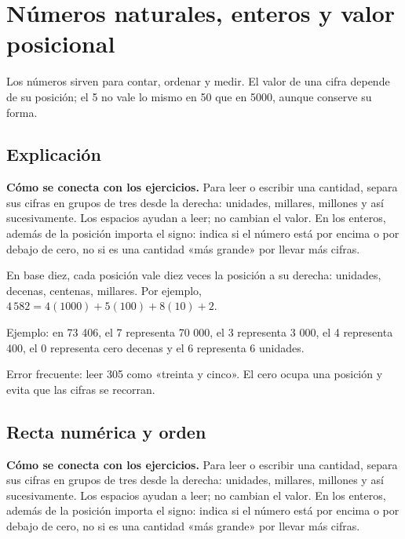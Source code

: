 \documentclass[10pt,oneside,openany]{book}
\begin{document}
\chapter{Números naturales, enteros y valor posicional}

\begin{idea}
Los números sirven para contar, ordenar y medir. El valor de una cifra depende de su posición; el 5 no vale lo mismo en 50 que en 5000, aunque conserve su forma.
\end{idea}

\section{Explicación}

\textbf{Cómo se conecta con los ejercicios.} Para leer o escribir una cantidad, separa sus cifras en grupos de tres desde la derecha: unidades, millares, millones y así sucesivamente. Los espacios ayudan a leer; no cambian el valor. En los enteros, además de la posición importa el signo: indica si el número está por encima o por debajo de cero, no si es una cantidad «más grande» por llevar más cifras.

En base diez, cada posición vale diez veces la posición a su derecha: unidades, decenas, centenas, millares. Por ejemplo, $4\,582=4(1000)+5(100)+8(10)+2$.



\begin{ejemplo}
Ejemplo: en 73 406, el 7 representa 70 000, el 3 representa 3 000, el 4 representa 400, el 0 representa cero decenas y el 6 representa 6 unidades.
\end{ejemplo}

\begin{ojo}
Error frecuente: leer 305 como «treinta y cinco». El cero ocupa una posición y evita que las cifras se recorran.
\end{ojo}



\section{Recta numérica y orden}

\textbf{Cómo se conecta con los ejercicios.} Para leer o escribir una cantidad, separa sus cifras en grupos de tres desde la derecha: unidades, millares, millones y así sucesivamente. Los espacios ayudan a leer; no cambian el valor. En los enteros, además de la posición importa el signo: indica si el número está por encima o por debajo de cero, no si es una cantidad «más grande» por llevar más cifras.
\end{document}
